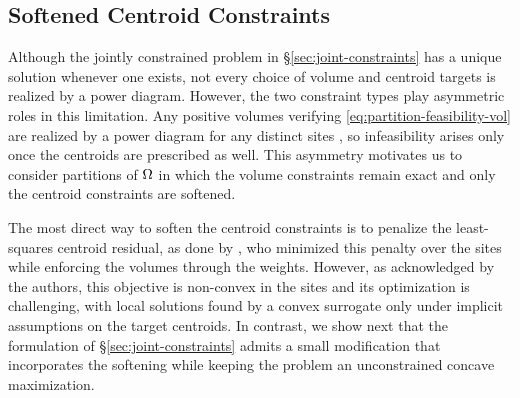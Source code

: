 \documentclass[main.tex]{subfiles}
\begin{document}
\subsection{Softened Centroid Constraints}
\label{sec:regularized-joint}

Although the jointly constrained problem in \S\ref{sec:joint-constraints} has a unique solution whenever one exists, not every choice of volume and centroid targets is realized by a power diagram.
% 
However, the two constraint types play asymmetric roles in this limitation.
Any positive volumes verifying \eqref{eq:partition-feasibility-vol} are realized by a power diagram for any distinct sites \cite{Aurenhammer1998Minkowski}, so infeasibility arises only once the centroids are prescribed as well.
This asymmetry motivates us to consider partitions of $\Omega$ in which the volume constraints remain exact and only the centroid constraints are {softened}.

The most direct way to soften the centroid constraints is to penalize the least-squares centroid residual, as done by \citet{Bourne2025Inverting}, who minimized this penalty over the sites while enforcing the volumes through the weights.
However, as acknowledged by the authors, this objective is non-convex in the sites and its optimization is challenging, with local solutions found by a convex surrogate only under implicit assumptions on the target centroids.
In contrast, we show next that the formulation of \S\ref{sec:joint-constraints} admits a small modification that incorporates the softening while keeping the problem an unconstrained concave maximization.
\end{document}
